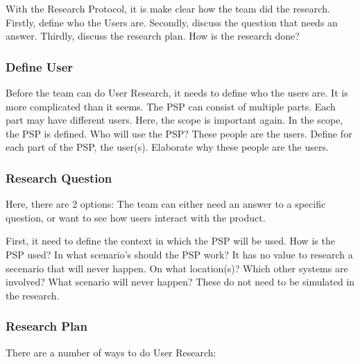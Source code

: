 \documentclass[10pt]{report}
\begin{document}
With the Research Protocol, it is make clear how the team did the research. Firstly, define who the Users are. Secondly, discuss the question that needs an answer. Thirdly, discuss the research plan. How is the research done?

\subsubsection{Define User}

Before the team can do User Research, it needs to define who the users are. It is more complicated than it seems. The PSP can consist of multiple parts. Each part may have different users. Here, the scope is important again. In the scope, the PSP is  defined. Who will use the PSP? These people are the users. Define for each part of the PSP, the user(s). Elaborate why these people are the users.

\subsubsection{Research Question}

Here, there are 2 options: The team can either need an answer to a specific question, or want to see how users interact with the product.

First, it need to define the context in which the PSP will be used. How is the PSP used? In what scenario's should the PSP work? It has no value to research a secenario that will never happen. On what location(s)? Which other systems are involved? What scenario will never happen? These do not need to be simulated in the research.

\subsubsection{Research Plan}

There are a number of ways to do User Research:
\end{document}
